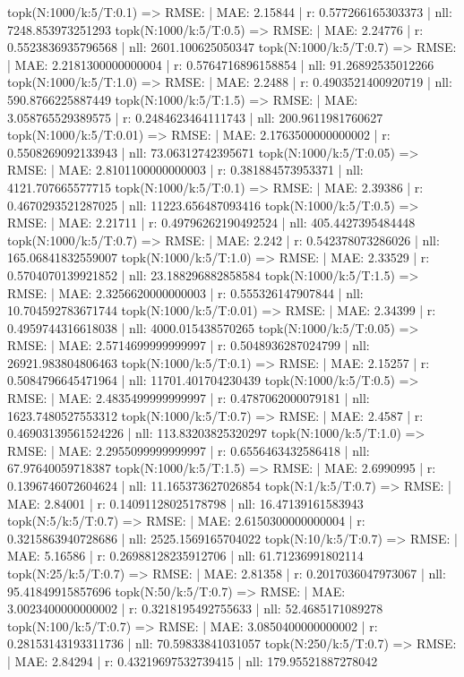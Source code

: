 topk(N:1000/k:5/T:0.1) => RMSE: | MAE: 2.15844 | r: 0.577266165303373 | nll: 7248.853973251293
topk(N:1000/k:5/T:0.5) => RMSE: | MAE: 2.24776 | r: 0.5523836935796568 | nll: 2601.100625050347
topk(N:1000/k:5/T:0.7) => RMSE: | MAE: 2.2181300000000004 | r: 0.5764716896158854 | nll: 91.26892535012266
topk(N:1000/k:5/T:1.0) => RMSE: | MAE: 2.2488 | r: 0.4903521400920719 | nll: 590.8766225887449
topk(N:1000/k:5/T:1.5) => RMSE: | MAE: 3.058765529389575 | r: 0.2484623464111743 | nll: 200.9611981760627
topk(N:1000/k:5/T:0.01) => RMSE: | MAE: 2.1763500000000002 | r: 0.5508269092133943 | nll: 73.06312742395671
topk(N:1000/k:5/T:0.05) => RMSE: | MAE: 2.8101100000000003 | r: 0.381884573953371 | nll: 4121.707665577715
topk(N:1000/k:5/T:0.1) => RMSE: | MAE: 2.39386 | r: 0.4670293521287025 | nll: 11223.656487093416
topk(N:1000/k:5/T:0.5) => RMSE: | MAE: 2.21711 | r: 0.49796262190492524 | nll: 405.4427395484448
topk(N:1000/k:5/T:0.7) => RMSE: | MAE: 2.242 | r: 0.542378073286026 | nll: 165.06841832559007
topk(N:1000/k:5/T:1.0) => RMSE: | MAE: 2.33529 | r: 0.5704070139921852 | nll: 23.188296882858584
topk(N:1000/k:5/T:1.5) => RMSE: | MAE: 2.3256620000000003 | r: 0.555326147907844 | nll: 10.704592783671744
topk(N:1000/k:5/T:0.01) => RMSE: | MAE: 2.34399 | r: 0.4959744316618038 | nll: 4000.015438570265
topk(N:1000/k:5/T:0.05) => RMSE: | MAE: 2.5714699999999997 | r: 0.5048936287024799 | nll: 26921.983804806463
topk(N:1000/k:5/T:0.1) => RMSE: | MAE: 2.15257 | r: 0.5084796645471964 | nll: 11701.401704230439
topk(N:1000/k:5/T:0.5) => RMSE: | MAE: 2.4835499999999997 | r: 0.4787062000079181 | nll: 1623.7480527553312
topk(N:1000/k:5/T:0.7) => RMSE: | MAE: 2.4587 | r: 0.46903139561524226 | nll: 113.83203825320297
topk(N:1000/k:5/T:1.0) => RMSE: | MAE: 2.2955099999999997 | r: 0.6556463432586418 | nll: 67.97640059718387
topk(N:1000/k:5/T:1.5) => RMSE: | MAE: 2.6990995 | r: 0.1396746072604624 | nll: 11.165373627026854
topk(N:1/k:5/T:0.7) => RMSE: | MAE: 2.84001 | r: 0.14091128025178798 | nll: 16.47139161583943
topk(N:5/k:5/T:0.7) => RMSE: | MAE: 2.6150300000000004 | r: 0.3215863940728686 | nll: 2525.1569165704022
topk(N:10/k:5/T:0.7) => RMSE: | MAE: 5.16586 | r: 0.26988128235912706 | nll: 61.71236991802114
topk(N:25/k:5/T:0.7) => RMSE: | MAE: 2.81358 | r: 0.2017036047973067 | nll: 95.41849915857696
topk(N:50/k:5/T:0.7) => RMSE: | MAE: 3.0023400000000002 | r: 0.3218195492755633 | nll: 52.4685171089278
topk(N:100/k:5/T:0.7) => RMSE: | MAE: 3.0850400000000002 | r: 0.28153143193311736 | nll: 70.59833841031057
topk(N:250/k:5/T:0.7) => RMSE: | MAE: 2.84294 | r: 0.43219697532739415 | nll: 179.95521887278042
